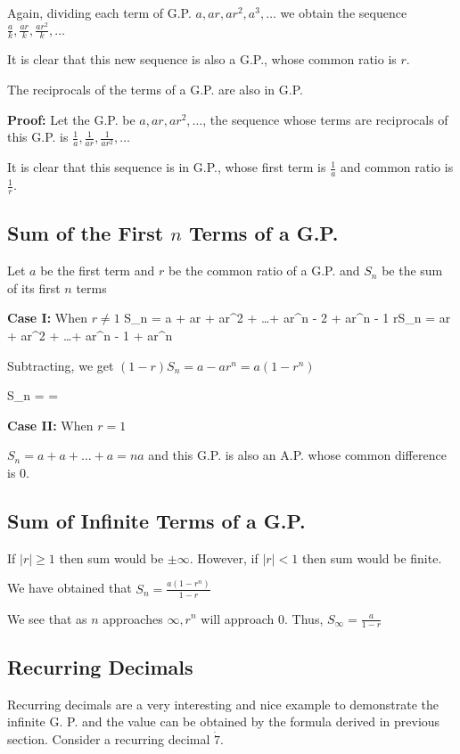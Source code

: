   Again, dividing each term of G.P. $a, ar, ar^2, a^3, \ldots$ we obtain the sequence $\frac{a}{k}, \frac{ar}{k}, \frac{ar^2}{k},
  \ldots$

  It is clear that this new sequence is also a G.P., whose common ratio is $r$.
\item The reciprocals of the terms of a G.P. are also in G.P.

  {\bf Proof:} Let the G.P. be $a, ar, ar^2, \ldots$, the sequence whose terms are reciprocals of this G.P. is $\frac{1}{a},
  \frac{1}{ar}, \frac{1}{ar^2}, \ldots$

  It is clear that this sequence is in G.P., whose first term is $\frac{1}{a}$ and common ratio is $\frac{1}{r}$.
\stopitemize

\subsection{Sum of the First $n$ Terms of a G.P.}
Let $a$ be the first term and $r$ be the common ratio of a G.P. and $S_n$ be the sum of its first $n$ terms

{\bf Case I:} When $r\neq 1$
\startformula S_n = a + ar + ar^2 + \ldots + ar^{n - 2} + ar^{n - 1}\stopformula
\startformula rS_n = ar + ar^2 + \ldots + ar^{n - 1} + ar^n\stopformula

Subtracting, we get $(1 - r)S_n = a - ar^n = a(1 - r^n)$

\startformula\therefore S_n =  = \stopformula

{\bf Case II:} When $r = 1$

$S_n = a + a + \ldots + a = na$ and this G.P. is also an A.P. whose common difference is $0$.

\subsection{Sum of Infinite Terms of a G.P.}
If $|r|\geq 1$ then sum would be $\pm\infty$. However, if $|r|< 1$ then sum would be finite.

We have obtained that $S_n = \frac{a(1 - r^n)}{1 - r}$

We see that as $n$ approaches $\infty, r^n$ will approach $0$. Thus, $S_\infty = \frac{a}{1 - r}$

\subsection{Recurring Decimals}
Recurring decimals are a very interesting and nice example to demonstrate the infinite G. P. and the value can be obtained by the
formula derived in previous section. Consider a recurring decimal $\dot{7}$.

